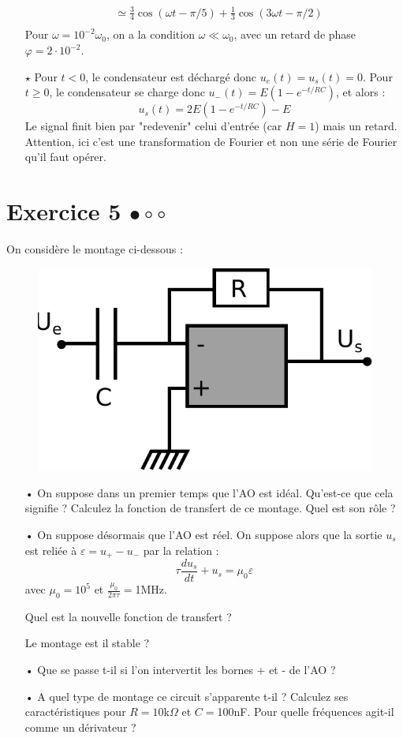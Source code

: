 \documentclass{report}
\begin{document}
\begin{itemize}
\begin{equation}
\begin{array}{lll}
		 & \simeq \frac{3}{4}\cos(\omega t - \pi/5) + \frac{1}{3}\cos(3\omega t - \pi/2)\\
	\end{array}
\end{equation}		
	Pour $\omega = 10^{-2}\omega_0$, on a la condition $\omega\ll\omega_0$, avec un retard de phase $\varphi = 2\cdot10^{-2}$.
	
	\item[$\star$] Pour $t<0$, le condensateur est déchargé donc $u_e(t)=u_s(t)=0$. Pour $t\geq0$, le condensateur se charge donc $u_-(t) = E(1-e^{-t/RC})$, et alors :
	\begin{equation}
		u_s(t)=2E(1-e^{-t/RC}) - E
	\end{equation}
	Le signal finit bien par "redevenir" celui d'entrée (car $H=1$) mais un retard. Attention, ici c'est une transformation de Fourier et non une série de Fourier qu'il faut opérer. 
	
\end{itemize}

\newpage

\section*{Exercice 5 $\bullet\circ\circ$}

On considère le montage ci-dessous :
\begin{figure}[!h]
\centering
\includegraphics[width=0.5\linewidth]{derivateur.pdf}
\end{figure}
\begin{itemize}
	\item[•] On suppose dans un premier temps que l'AO est idéal. Qu'est-ce que cela signifie ? Calculez la fonction de transfert de ce montage. Quel est son rôle ?
	\item[•] On suppose désormais que l'AO est réel. On suppose alors que la sortie $u_s$ est reliée à $\varepsilon=u_+-u_-$ par la relation :
	\begin{equation}
		\tau\frac{du_s}{dt} +u_s = \mu_0\varepsilon
	\end{equation}
	avec $\mu_0=10^5$ et $\frac{\mu_0}{2\pi\tau}=$1MHz.
	
	Quel est la nouvelle fonction de transfert ? 
	
	Le montage est il stable ?
	
	\item[•] Que se passe t-il si l'on intervertit les bornes + et - de l'AO ?
	
	\item[•] A quel type de montage ce circuit s'apparente t-il ? Calculez ses caractéristiques pour $R=10$k$\Omega$ et $C=$100nF. Pour quelle fréquences agit-il comme un dérivateur ? 
\end{itemize}
\end{document}
